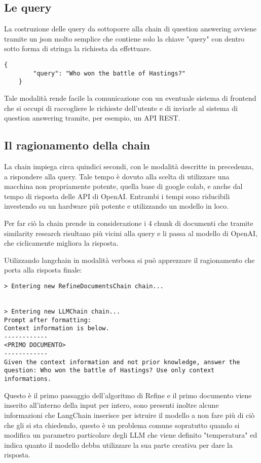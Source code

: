 \subsection{Le query}
La costruzione delle query da sottoporre alla chain di question answering avviene tramite un json molto semplice che contiene solo la chiave "query" con dentro sotto forma di stringa la richiesta da effettuare.
\begin{lstlisting}[firstnumber=1]
    {
        "query": "Who won the battle of Hastings?"
    }
\end{lstlisting}

Tale modalità rende facile la comunicazione con un eventuale sistema di frontend che si occupi di raccogliere le richieste dell'utente e di inviarle al sistema di question answering tramite, per esempio, un API REST.

\subsection{Il ragionamento della chain}

La chain impiega circa quindici secondi, con le modalità descritte in precedenza, a rispondere alla query.
Tale tempo è dovuto alla scelta di utilizzare una macchina non propriamente potente, quella base di google colab, e anche dal tempo di risposta delle API di OpenAI.
Entrambi i tempi sono riducibili investendo su un hardware più potente e utilizzando un modello in loco.

Per far ciò la chain prende in considerazione i 4 chunk di documenti che tramite similarity research risultano più vicini alla query e li passa al modello di OpenAI, che ciclicamente migliora la risposta.

Utilizzando langchain in modalità verbosa si può apprezzare il ragionamento che porta alla risposta finale:

\begin{lstlisting}[breaklines]
    > Entering new RefineDocumentsChain chain...


> Entering new LLMChain chain...
Prompt after formatting:
Context information is below. 
------------
<PRIMO DOCUMENTO>
------------
Given the context information and not prior knowledge, answer the question: Who won the battle of Hastings? Use only context informations.

\end{lstlisting}

Questo è il primo passaggio dell'algoritmo di Refine e il primo documento viene inserito all'interno della input per intero, sono presenti inoltre alcune informazioni che LangChain inserisce per istruire il modello a non fare più di ciò che gli si sta chiedendo, questo è un problema comune sopratutto quando si modifica un parametro particolare degli LLM che viene definito "temperatura" ed indica quanto il modello debba utilizzare la sua parte creativa per dare la risposta.

